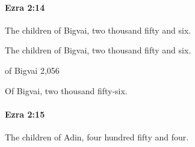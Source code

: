 		\paragraph{Ezra 2:14} %
			\label{EZRA-2-14}

			The children of Bigvai, two thousand fifty and six.

			\begin{versebox}
					\item[BHS] 
					\item[LXX] 
					\item[ASV] The children of Bigvai, two thousand fifty and six.
					\item[NIV] of Bigvai 2,056
					\item[NRSV] Of Bigvai, two thousand fifty-six.
			\end{versebox}

		\paragraph{Ezra 2:15} %
			\label{EZRA-2-15}

			The children of Adin, four hundred fifty and four.

